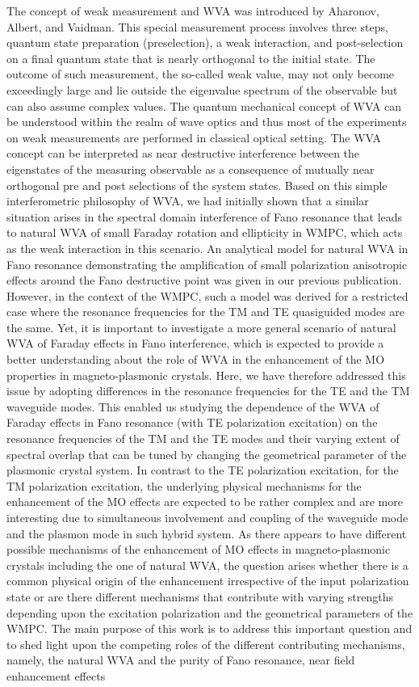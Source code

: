 \documentclass[13pt]{article}
\begin{document}
\par
	The concept of weak measurement and WVA was introduced by Aharonov, Albert, and Vaidman. This special measurement process involves three steps, quantum state preparation (preselection), a weak interaction, and post-selection on a final quantum state that is nearly orthogonal to the initial state. The outcome of such measurement, the so-called weak value, may not only become exceedingly large and lie outside the eigenvalue spectrum of the observable but can also assume complex values. The quantum mechanical concept of WVA can be understood within the realm of wave optics and thus most of the experiments on weak measurements are performed in classical optical setting. The WVA concept can be interpreted as near destructive interference between the eigenstates of the measuring observable as a consequence of mutually near orthogonal pre and post selections of the system states. Based on this simple interferometric philosophy of WVA, we had initially shown that a similar situation arises in the spectral domain interference of Fano resonance that leads to natural WVA of small Faraday rotation and ellipticity in WMPC, which acts as the weak interaction in this scenario. An analytical model for natural WVA in Fano resonance demonstrating the amplification of small polarization anisotropic effects around the Fano destructive point was given in our previous publication. However, in the context of the WMPC, such a model was derived for a restricted case where the resonance frequencies for the TM and TE quasiguided modes are the same. Yet, it is important to investigate a more general scenario of natural WVA of Faraday effects in Fano interference, which is expected to provide a better understanding about the role of WVA in the enhancement of the MO properties in magneto-plasmonic crystals. Here, we have therefore addressed this issue by adopting differences in the resonance frequencies for the TE and the TM waveguide modes. This enabled us studying the dependence of the WVA of Faraday effects in Fano resonance (with TE polarization excitation) on the resonance frequencies of the TM and the TE modes and their varying extent of spectral overlap that can be tuned by changing the geometrical parameter of the plasmonic crystal system. In contrast to the TE polarization excitation, for the TM polarization excitation, the underlying physical mechanisms for the enhancement of the MO effects are expected to be rather complex and are more interesting due to simultaneous involvement and coupling of the waveguide mode and the plasmon mode in such hybrid system. As there appears to have different possible mechanisms of the enhancement of MO effects in magneto-plasmonic crystals including the one of natural WVA, the question arises whether there is a common physical origin of the enhancement irrespective of the input polarization state or are there different mechanisms that contribute with varying strengths depending upon the excitation polarization and the geometrical parameters of the WMPC. The main purpose of this work is to address this important question and to shed light upon the competing roles of the different contributing mechanisms, namely, the natural WVA and the purity of Fano resonance, near field enhancement effects 
\end{document}
